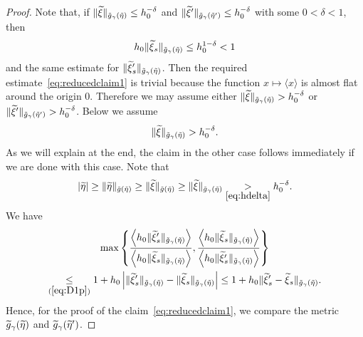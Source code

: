 \documentclass[10pt]{amsart}
\theoremstyle{definition}\newtheorem{defi}[theo]{Definition}\newtheorem{rema}[theo]{Remark}\newtheorem{exam}[theo]{Example}\newtheorem{exem}[theo]{Example}\newtheorem{nota}[theo]{Notation}
\newcommand*\ineq[1]{\underset{(#1)}{\leq}}
\let\oldtilde\tilde
\renewcommand*{\tilde}[1]{\mathchoice{\widetilde{#1}}{\widetilde{#1}}{\oldtilde{#1}}{\oldtilde{#1}}}
\begin{document}
\begin{proof}
Note that, if $\|\tilde{\xi}\|_{\tilde{g}_{\gamma}(\tilde{\eta})}\le h_{0}^{-\delta}$ and $\|\tilde{\xi}'\|_{\tilde{g}_{\gamma}(\tilde{\eta}')}\le h_{0}^{-\delta}$ with some $0<\delta<1$, then
\[
h_{0}\|\tilde{\xi}_{s}\|_{\tilde{g}_{\gamma}\left(\tilde{\eta}\right)}\le h_{0}^{1-\delta}<1
\]
and the same estimate for $\|\tilde{\xi}'_{s}\|_{\tilde{g}_{\gamma}(\tilde{\eta})}$. Then the required estimate~\eqref{eq:reducedclaim1} is trivial because the function $x\mapsto\langle x\rangle$ is almost flat around the origin $0$. Therefore we may assume either $\|\tilde{\xi}\|_{\tilde{g}_{\gamma}(\tilde{\eta})}>h_{0}^{-\delta}$ or $\|\tilde{\xi}'\|_{\tilde{g}_{\gamma}(\tilde{\eta}')}>h_{0}^{-\delta}$. Below we assume
\begin{equation}\label{eq:hdelta}
\|\tilde{\xi}\|_{\tilde{g}_{\gamma}\left(\tilde{\eta}\right)}>h_{0}^{-\delta}.
\end{equation}
As we will explain at the end, the claim in the other case follows immediately if we are done with this case. Note that
\begin{equation}\label{eq:eta}
|\tilde{\eta}|\ge\|\tilde{\eta}\|_{\tilde{g}\left(\tilde{\eta}\right)}\ge\|\tilde{\xi}\|_{\tilde{g}\left(\tilde{\eta}\right)}\ge\|\tilde{\xi}\|_{\tilde{g}_{\gamma}\left(\tilde{\eta}\right)}\underset{\eqref{eq:hdelta}}{>}h_{0}^{-\delta}.
\end{equation}
We have
\begin{multline}\label{eq:basic}
\max\left\{ \frac{\left\langle h_{0}\|\tilde{\xi}'_{s}\|_{\tilde{g}_{\gamma}\left(\tilde{\eta}\right)}\right\rangle}{\left\langle h_{0}\|\tilde{\xi}_{s}\|_{\tilde{g}_{\gamma}\left(\tilde{\eta}\right)}\right\rangle},\frac{\left\langle h_{0}\|\tilde{\xi}_{s}\|_{\tilde{g}_{\gamma}\left(\tilde{\eta}\right)}\right\rangle}{\left\langle h_{0}\|\tilde{\xi}'_{s}\|_{\tilde{g}_{\gamma}\left(\tilde{\eta}\right)}\right\rangle}\right\}\\
\ineq{\ref{eq:D1p}}1+h_{0}\left|\|\tilde{\xi}'_{s}\|_{\tilde{g}_{\gamma}\left(\tilde{\eta}\right)}-\|\tilde{\xi}{}_{s}\|_{\tilde{g}_{\gamma}\left(\tilde{\eta}\right)}\right|\le1+h_{0}\|\tilde{\xi}'_{s}-\tilde{\xi}_{s}\|_{\tilde{g}_{\gamma}\left(\tilde{\eta}\right)}.
\end{multline}
Hence, for the proof of the claim~\eqref{eq:reducedclaim1}, we compare the metric $\tilde{g}_{\gamma}(\tilde{\eta})$ and $\tilde{g}_{\gamma}(\tilde{\eta}')$.


\end{proof}
\end{document}

